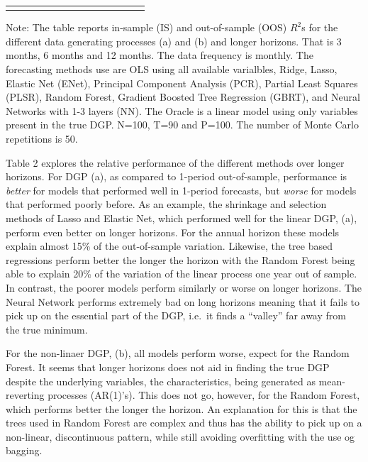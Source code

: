 \documentclass[]{article}
\begin{document}
\begin{table}[ht]
\begin{threeparttable}
\begin{tabular}{lrrrrrrcrrrrrr}
  \Xhline{2\arrayrulewidth}
\end{tabular}
\begin{tablenotes}
      \small
      \item Note: The table reports in-sample (IS) and out-of-sample (OOS) $R^2$s for the different data generating processes (a) and (b) and longer horizons. That is 3 months, 6 months and 12 months. The data frequency is monthly. The forecasting methods use are OLS using all available varialbles, Ridge, Lasso, Elastic Net (ENet), Principal Component Analysis (PCR), Partial Least Squares (PLSR), Random Forest, Gradient Boosted Tree Regression (GBRT), and Neural Networks with 1-3 layers (NN). The Oracle is a linear model using only variables present in the true DGP. N=100, T=90 and P=100. The number of Monte Carlo repetitions is 50.
    \end{tablenotes}
  \end{threeparttable}
\label{table:horizon}
\end{table}

Table 2 explores the relative performance of the different methods over
longer horizons. For DGP (a), as compared to 1-period out-of-sample,
performance is \emph{better} for models that performed well in 1-period
forecasts, but \emph{worse} for models that performed poorly before. As
an example, the shrinkage and selection methods of Lasso and Elastic
Net, which performed well for the linear DGP, (a), perform even better
on longer horizons. For the annual horizon these models explain almost
15\% of the out-of-sample variation. Likewise, the tree based
regressions perform better the longer the horizon with the Random Forest
being able to explain 20\% of the variation of the linear process one
year out of sample. In contrast, the poorer models perform similarly or
worse on longer horizons. The Neural Network performs extremely bad on
long horizons meaning that it fails to pick up on the essential part of
the DGP, i.e.~it finds a ``valley'' far away from the true minimum.

For the non-linaer DGP, (b), all models perform worse, expect for the
Random Forest. It seems that longer horizons does not aid in finding the
true DGP despite the underlying variables, the characteristics, being
generated as mean-reverting processes (AR(1)'s). This does not go,
however, for the Random Forest, which performs better the longer the
horizon. An explanation for this is that the trees used in Random Forest
are complex and thus has the ability to pick up on a non-linear,
discontinuous pattern, while still avoiding overfitting with the use og
bagging.
\end{document}
